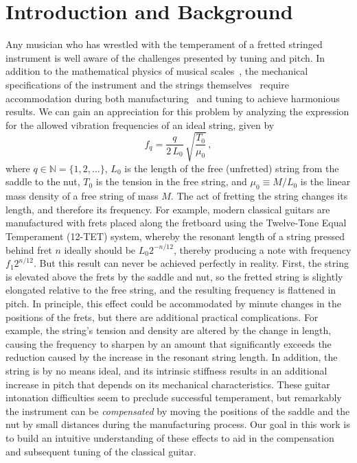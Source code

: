%
%
%

 \section{Introduction and Background\label{sct:intro}}

Any musician who has wrestled with the temperament of a fretted stringed instrument is well aware of the challenges presented by tuning and pitch. In addition to the mathematical physics of musical scales~\cite{ref:durfee2015pms}, the mechanical specifications of the instrument and the strings themselves~\cite{ref:morse1981vas,ref:fletcher2005pmi} require accommodation during both manufacturing~\cite{ref:byers1996cgi,ref:varieschi2010icf} and tuning to achieve harmonious results. We can gain an appreciation for this problem by analyzing the expression for the allowed vibration frequencies of an ideal string, given by~\cite{ref:morse1981vsa,ref:fletcher2005pma}
 \begin{equation} \label{eqn:f_0_def}
f_q = \frac{q}{2\, L_0}\, \sqrt{\frac{T_0}{\mu_0}}\, ,
 \end{equation}
where $q \in \mathbb{N} = \{1, 2, \dots\}$, $L_0$ is the length of the free (unfretted) string from the saddle to the nut, $T_0$ is the tension in the free string, and $\mu_0 \equiv M / L_0$ is the linear mass density of a free string of mass $M$. The act of fretting the string changes its length, and therefore its frequency. For example, modern classical guitars are manufactured with frets placed along the fretboard using the Twelve-Tone Equal Temperament (12-TET) system, whereby the resonant length of a string pressed behind fret $n$ ideally should be $L_0 2^{-n/12}$, thereby producing a note with frequency $f_1 2^{n/12}$. But this result can never be achieved perfectly in reality. First, the string is elevated above the frets by the saddle and nut, so the fretted string is slightly elongated relative to the free string, and the resulting frequency is flattened in pitch. In principle, this effect could be accommodated by minute changes in the positions of the frets, but there are additional practical complications. For example, the string's tension and density are altered by the change in length, causing the frequency to sharpen by an amount that significantly exceeds the reduction caused by the increase in the resonant string length. In addition, the string is by no means ideal, and its intrinsic stiffness results in an additional increase in pitch that depends on its mechanical characteristics. These guitar intonation difficulties seem to preclude successful temperament, but remarkably the instrument can be \emph{compensated} by moving the positions of the saddle and the nut by small distances during the manufacturing process. Our goal in this work is to build an intuitive understanding of these effects to aid in the compensation and subsequent tuning of the classical guitar.


